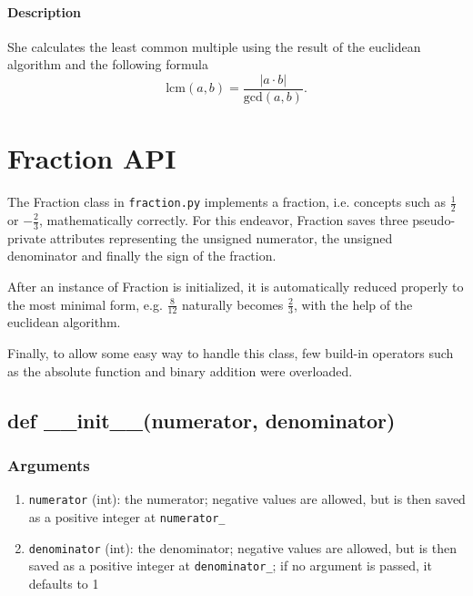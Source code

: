 \documentclass[refman]{scrartcl}
\begin{document}
\paragraph*{Description}

She calculates the least common multiple using the result of the euclidean algorithm and the following formula
%
\[\text{lcm}(a, b) = \frac{|a \cdot b|}{\text{gcd}(a, b)} \text{.}\]


\section{Fraction API}

The Fraction class in \texttt{fraction.py} implements a fraction, i.e. concepts such as \(\frac{1}{2}\) or \(-\frac{2}{3}\), mathematically correctly. For this endeavor, Fraction saves three pseudo-private attributes representing the unsigned numerator, the unsigned denominator and finally the sign of the fraction.

After an instance of Fraction is initialized, it is automatically reduced properly to the most minimal form, e.g. \(\frac{8}{12}\) naturally becomes \(\frac{2}{3}\), with the help of the euclidean algorithm.

Finally, to allow some easy way to handle this class, few build-in operators such as the absolute function and binary addition were overloaded.

\subsection{def \_\_init\_\_(numerator, denominator)}

\subsubsection*{Arguments}

\begin{enumerate}
  \item \texttt{numerator} (int): the numerator; negative values are allowed, but is then saved as a positive integer at \texttt{numerator\_}
  \item \texttt{denominator} (int): the denominator; negative values are allowed, but is then saved as a positive integer at \texttt{denominator\_}; if no argument is passed, it defaults to 1
\end{enumerate}
\end{document}
